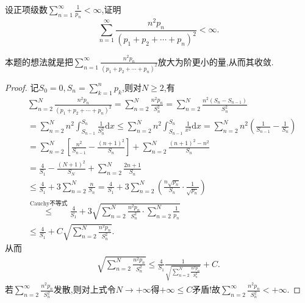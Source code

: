 \documentclass[../../main.tex]{subfiles}
\begin{document}
\begin{example}
设正项级数$\sum\limits_{n=1}^\infty \frac{1}{p_n}<\infty$,证明
$$\sum_{n=1}^\infty \frac{n^2 p_n}{(p_1+p_2+\cdots +p_n)^2}<\infty.$$
\end{example}
\begin{remark}
本题的想法就是把$\sum\limits_{n=1}^\infty \frac{n^2 p_n}{(p_1+p_2+\cdots +p_n)^2}$放大为阶更小的量,从而其收敛.
\end{remark}
\begin{proof}
记$S_0=0,S_n=\sum_{k=1}^n{p_k}$,则对$N\geqslant 2$,有
\begin{align*}
&\sum_{n=2}^N{\frac{n^2p_n}{(p_1+p_2+\cdots +p_n)^2}}=\sum_{n=2}^N{\frac{n^2p_n}{S_{n}^{2}}}=\sum_{n=2}^N{\frac{n^2\left( S_n-S_{n-1} \right)}{S_{n}^{2}}} \\
&=\sum_{n=2}^N{n^2\int_{S_{n-1}}^{S_n}{\frac{1}{S_{n}^{2}}\mathrm{d}x}}\leqslant \sum_{n=2}^N{n^2\int_{S_{n-1}}^{S_n}{\frac{1}{x^2}\mathrm{d}x}}=\sum_{n=2}^N{n^2\left( \frac{1}{S_{n-1}}-\frac{1}{S_n} \right)} \\
&=\sum_{n=2}^N{\left[ \frac{n^2}{S_{n-1}}-\frac{\left( n+1 \right) ^2}{S_n} \right]}+\sum_{n=2}^N{\frac{\left( n+1 \right) ^2-n^2}{S_n}} \\
&=\frac{4}{S_1}-\frac{\left( N+1 \right) ^2}{S_N}+\sum_{n=2}^N{\frac{2n+1}{S_n}} \\
&\leqslant \frac{4}{S_1}+3\sum_{n=2}^N{\frac{n}{S_n}}=\frac{4}{S_1}+3\sum_{n=2}^N{\left( \frac{n\sqrt{p_n}}{S_n}\cdot \frac{1}{\sqrt{p_n}} \right)} \\
&\overset{\text{Cauchy不等式}}{\leqslant}\frac{4}{S_1}+3\sqrt{\sum_{n=2}^N{\frac{n^2p_n}{S_{n}^{2}}}\cdot \sum_{n=2}^N{\frac{1}{p_n}}} \\
&\leqslant \frac{4}{S_1}+C\sqrt{\sum_{n=2}^N{\frac{n^2p_n}{S_{n}^{2}}}}.
\end{align*}
从而
\begin{align*}
\sqrt{\sum_{n=2}^N{\frac{n^2p_n}{S_{n}^{2}}}}\leqslant \frac{4}{S_1}\frac{1}{\sqrt{\sum\limits_{n=2}^N{\frac{n^2p_n}{S_{n}^{2}}}}}+C.
\end{align*}
若$\sum_{n=2}^{\infty}{\frac{n^2p_n}{S_{n}^{2}}}$发散,则对上式令$N\rightarrow +\infty$得$+\infty \leqslant C$矛盾!故$\sum_{n=2}^{\infty}{\frac{n^2p_n}{S_{n}^{2}}}<+\infty .$

\end{proof}
\end{document}
